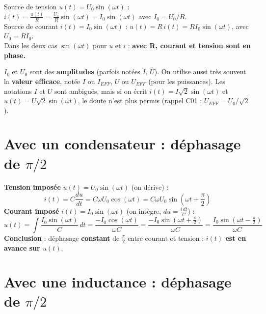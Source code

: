 
\begin{thmbox}[title=Résistance en sinusoïdal]
Source de tension $u(t) = U_0\sin(\omega t)$ :
$i(t) = \frac{u(t)}{R} = \frac{U_0}{R}\sin(\omega t) = I_0\sin(\omega t)$ avec
$I_0 = U_0/R$. \\
Source de courant $i(t) = I_0\sin(\omega t)$ : $u(t) = R\,i(t) = R I_0\sin(\omega t)$, avec
$U_0 = R I_0$. \\
Dans les deux cas $\sin(\omega t)$ pour $u$ et $i$ : \textbf{avec R, courant et tension sont
en phase.}
\end{thmbox}

\begin{warnbox}[title=Amplitude ou valeur efficace ?]
$I_0$ et $U_0$ sont des \textbf{amplitudes} (parfois notées $\hat I$, $\hat U$). On utilise
aussi très souvent la \textbf{valeur efficace}, notée $I$ ou $I_{EFF}$, $U$ ou $U_{EFF}$
(pour les puissances). Les notations $I$ et $U$ sont ambiguës, mais si on écrit
$i(t) = I\sqrt2\sin(\omega t)$ et $u(t) = U\sqrt2\sin(\omega t)$, le doute n'est plus permis
(rappel C01 : $U_{EFF} = U_0/\sqrt2$).
\end{warnbox}

\section{Avec un condensateur : déphasage de $\pi/2$}


\begin{thmbox}[title=Condensateur en sinusoïdal]
\textbf{Tension imposée} $u(t) = U_0\sin(\omega t)$ (on dérive) :
\[ i(t) = C\frac{du}{dt} = C\omega U_0\cos(\omega t) = C\omega U_0\sin\!\left(\omega t + \frac\pi2\right) \]
\textbf{Courant imposé} $i(t) = I_0\sin(\omega t)$ (on intègre, $du = \frac{i\,dt}{C}$) :
\[ u(t) = \int\frac{I_0\sin(\omega t)}{C}\,dt = \frac{-I_0\cos(\omega t)}{\omega C}
   = \frac{-I_0\sin(\omega t + \frac\pi2)}{\omega C} = \frac{I_0\sin(\omega t - \frac\pi2)}{\omega C} \]
\textbf{Conclusion} : déphasage \textbf{constant} de $\frac\pi2$ entre courant et tension ;
\textbf{$i(t)$ est en avance sur $u(t)$}.
\end{thmbox}

\section{Avec une inductance : déphasage de $\pi/2$}

